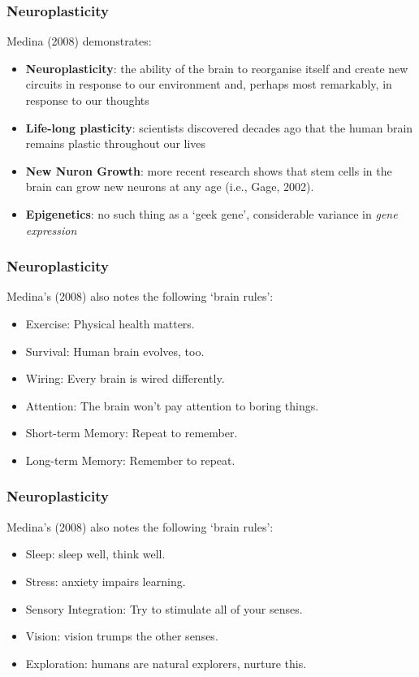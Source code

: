 
\begin{frame}
	\frametitle{Neuroplasticity}
	
	Medina (2008) demonstrates:
	
	\begin{itemize}
		\item \textbf{Neuroplasticity}: the ability of the brain to reorganise itself and 
		create new circuits in response to our environment and, perhaps most remarkably,
		 in response to our thoughts
		\item \textbf{Life-long plasticity}: scientists discovered decades ago that the human
		brain remains plastic throughout our lives
		\item \textbf{New Nuron Growth}: more recent research shows that stem cells in the brain
		can grow new neurons at any age (i.e., Gage, 2002).
		\item \textbf{Epigenetics}: no such thing as a `geek gene', considerable
		variance in \textit{gene expression}
	\end{itemize}
\end{frame}

\begin{frame}
	\frametitle{Neuroplasticity}
	
	Medina's (2008) also notes the following `brain rules':
	
	\begin{itemize}
		\item Exercise: Physical health matters.
		\item Survival: Human brain evolves, too.
		\item Wiring: Every brain is wired differently.
		\item Attention: The brain won't pay attention to boring things.
		\item Short-term Memory: Repeat to remember.
		\item Long-term Memory: Remember to repeat.
	\end{itemize}
\end{frame}

\begin{frame}
	\frametitle{Neuroplasticity}
	
	Medina's (2008) also notes the following `brain rules':
	
	\begin{itemize}
		\item Sleep: sleep well, think well.
		\item Stress: anxiety impairs learning.
		\item Sensory Integration: Try to stimulate all of your senses.
		\item Vision: vision trumps the other senses.
		\item Exploration: humans are natural explorers, nurture this.
	\end{itemize}
\end{frame}

